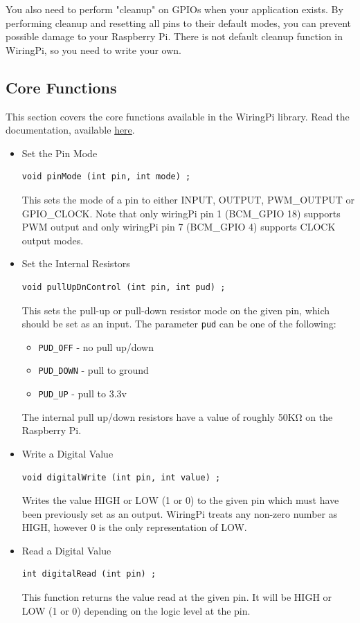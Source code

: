 You also need to perform "cleanup" on GPIOs when your application exists. By performing cleanup and resetting all pins to their default modes, you can prevent possible damage to your Raspberry Pi. There is not default cleanup function in WiringPi, so you need to write your own.



\subsection{Core Functions}
This section covers the core functions available in the WiringPi library. Read the documentation, available \href{http://wiringpi.com/reference/core-functions/}{here}.

\begin{itemize}
    \item Set the Pin Mode
        \begin{lstlisting}[gobble = 8]
        void pinMode (int pin, int mode) ;
        \end{lstlisting}
        This sets the mode of a pin to either INPUT, OUTPUT, PWM\_OUTPUT or GPIO\_CLOCK. Note that only wiringPi pin 1 (BCM\_GPIO 18) supports PWM output and only wiringPi pin 7 (BCM\_GPIO 4) supports CLOCK output modes.
    \item Set the Internal Resistors
        \begin{lstlisting}[gobble = 8]
        void pullUpDnControl (int pin, int pud) ;
        \end{lstlisting}
        This sets the pull-up or pull-down resistor mode on the given pin, which should be set as an input. The parameter \verb|pud| can be one of the following:
        \begin{itemize}
            \item \verb|PUD_OFF| - no pull up/down 
            \item \verb|PUD_DOWN| - pull to ground 
            \item \verb|PUD_UP| -  pull to 3.3v 
        \end{itemize}
        The internal pull up/down resistors have a value of roughly 50KΩ on the Raspberry Pi.
    \item Write a Digital Value
        \begin{lstlisting}[gobble = 8]
        void digitalWrite (int pin, int value) ;
        \end{lstlisting}
        Writes the value HIGH or LOW (1 or 0) to the given pin which must have been previously set as an output. WiringPi treats any non-zero number as HIGH, however 0 is the only representation of LOW.
    
    \item Read a Digital Value
        \begin{lstlisting}[gobble = 8]
        int digitalRead (int pin) ;
        \end{lstlisting}
        This function returns the value read at the given pin. It will be HIGH or LOW (1 or 0) depending on the logic level at the pin.
    \end{itemize}


